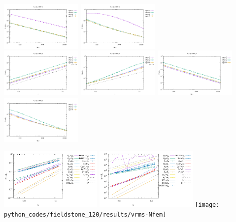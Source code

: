 \begin{center}
\includegraphics[width=4cm]{python_codes/fieldstone_120/results/DSSY1Q0-velocity-Nfem.pdf}
\includegraphics[width=4cm]{python_codes/fieldstone_120/results/DSSY1Q0-pressure-Nfem.pdf}
\\
\includegraphics[width=4cm]{python_codes/fieldstone_120/results/DSSY2Q0-velocity-h.pdf}
\includegraphics[width=4cm]{python_codes/fieldstone_120/results/DSSY2Q0-pressure-h.pdf}
\includegraphics[width=4cm]{python_codes/fieldstone_120/results/DSSY2Q0-velocity-Nfem.pdf}
\includegraphics[width=4cm]{python_codes/fieldstone_120/results/DSSY2Q0-pressure-Nfem.pdf}
\\
\end{center}



\begin{center}
\includegraphics[width=5cm]{python_codes/fieldstone_120/results/errors-velocity-all}
\includegraphics[width=5cm]{python_codes/fieldstone_120/results/errors-pressure-all}
\texttt{[image: python\_codes/fieldstone\_120/results/vrms-Nfem]}
\end{center}


